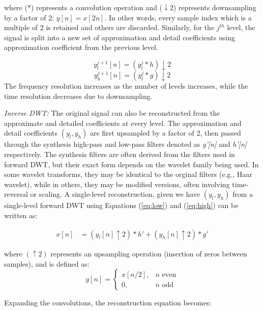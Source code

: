 where ($\ast$) represents a convolution operation and ($\downarrow2$) represents downsampling by a factor of $2$:
$y[n]=x[2n]$. In other words, every sample index which is a multiple of $2$ is retained and others are discarded.
Similarly, for the $j^{th}$ level, the signal is split into a new set of approximation and detail coefficients using
approximation coefficient from the previous level. 

\begin{equation}
   y_{l}^{j+1}[n] = (y_{l}^j \ast h) \downarrow 2 
\end{equation}
\begin{equation}
   y_{h}^{j+1}[n] = (y_{l}^j \ast g) \downarrow 2 
\end{equation}
The frequency resolution increases as the number of levels increases, while the time resolution decreases due to downsampling. 

{\em Inverse DWT: } The original signal can also be reconstructed from the approximate and detailed coefficients at
every level.  The approximation and detail coefficients $(y_l, y_h)$ are first upsampled by a factor of 2, then passed
through the synthesis high-pass and low-pass filters denoted as {\em g'[n]} and {\em h'[n]} respectively. The synthesis
filters are often derived from the filters used in forward DWT, but their exact form depends on the wavelet family being
used. In some wavelet transforms, they may be identical to the orginal filters (e.g., Haar wavelet), while in others,
they may be modified versions, often involving time-reversal or scaling. A single-level reconstruction, given we have
$(y_l, y_h)$ from a single-level forward DWT using Equations  (\ref{eq:low}) and (\ref{eq:high}) can be written as:

\begin{align} 
x[n] &= (y_l[n] \uparrow 2) \ast h' + (y_h[n] \uparrow 2) \ast g' 
\end{align}

where $(\uparrow 2)$ represents an upsampling operation (insertion of zeros between samples), and is defined as:
\begin{equation}
\label{eq:upsample}
y[n] = \begin{cases} x[n/2], & n \text{ even} \\ 
0, & n \text{ odd} 
\end{cases} 
\end{equation}

Expanding the convolutions, the reconstruction equation becomes:

